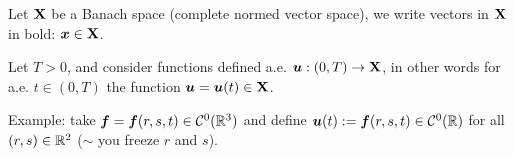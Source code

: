 



Let $\mathbf{X}$ be a Banach space (complete normed vector space), we write vectors in $\mathbf{X}$ in bold: $\bm x \in \mathbf{X}$.

\medskip


Let $T>0$, and consider functions defined a.e. $\bm u:(0,T)\to \mathbf{X}$, in other words for a.e. $t\in(0,T)$ the function $\bm u=\bm u(t)\in \mathbf{X}$. 

\smallskip

Example: take $\bm f = \bm f(r,s,t)\in \mathcal{C}^0(\mathbb{R}^3)$ and define $\bm u(t):=\bm f(r,s,t)\in \mathcal{C}^0(\mathbb{R})$ for all $(r,s)\in\mathbb{R}^2$ ($\sim$ you freeze $r$ and $s$).

\smallskip

